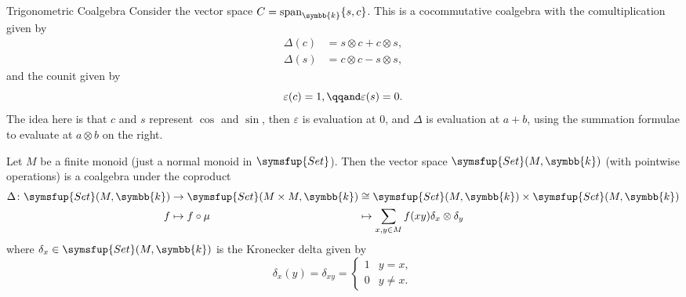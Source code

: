 \documentclass[fleqn]{NotesClass}
\makeatletter
\newcommand{\c@egory}[1]{\symsfup{#1}}
\newcommand{\Set}{\c@egory{Set}}
\newcommand{\isomorphic}{\cong}
\renewcommand{\field}{\symbb{k}}
\DeclareMathOperator{\Span}{span}
\makeatother
\begin{document}
    \begin{exm}{Trigonometric Coalgebra}{}
        Consider the vector space \(C = \Span_{\field}\{s, c\}\).
        This is a cocommutative coalgebra with the comultiplication given by
        \begin{align}
            \Delta(c) &= s \otimes c + c \otimes s,\\
            \Delta(s) &= c \otimes c - s \otimes s,
        \end{align}
        and the counit given by
        \begin{equation}
            \varepsilon(c) = 1, \qqand \varepsilon(s) = 0.
        \end{equation}
        The idea here is that \(c\) and \(s\) represent \(\cos\) and \(\sin\), then \(\varepsilon\) is evaluation at 0, and \(\Delta\) is evaluation at \(a + b\), using the summation formulae to evaluate at \(a \otimes b\) on the right.
    \end{exm}
    
    \begin{exm}{}{}
        Let \(M\) be a finite monoid (just a normal monoid in \(\Set\)).
        Then the vector space \(\Set(M, \field)\) (with pointwise operations) is a coalgebra under the coproduct
        \begin{equation}
            \begin{alignedat}{3}
                \Delta \colon \Set(M, \field) &\to \Set(M \times M, \field) &&\isomorphic \Set(M, \field) \times \Set(M, \field)\\
                f &\mapsto f \circ \mu &&\mapsto \sum_{x, y \in M} f(xy) \delta_x \otimes \delta_y
            \end{alignedat}
        \end{equation}
        where \(\delta_x \in \Set(M, \field)\) is the Kronecker delta given by
        \begin{equation}
            \delta_x(y) = \delta_{xy} = 
            \begin{cases}
                1 & y = x,\\
                0 & y \ne x.
            \end{cases}
        \end{equation}
    \end{exm}
    
    
    \backmatter
    \renewcommand{\glossaryname}{Acronyms}
    \printglossary[acronym]
    \printindex
\end{document}
